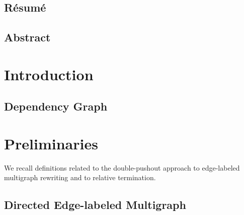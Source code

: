 \documentclass{report}
\begin{document}
  
   
  
 
\newpage  
\section*{Résumé}
  
 
\newpage
\section*{Abstract} 

  
% 
\newpage       
  
  
\tableofcontents   
\newpage      

\chapter{Introduction}  

\section{Dependency Graph}

\chapter{Preliminaries}
\label{chap:preliminaries}
We recall definitions related to the double-pushout approach to edge-labeled multigraph rewriting and to relative termination. 
% 
\section{Directed Edge-labeled Multigraph} 
\label{Preliminaries:Graphs}
 
\end{document}
